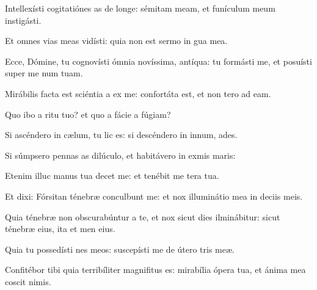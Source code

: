 \item {}

\item Intellexísti cogitatiónes as de longe:\psstar{} sémitam meam, et funículum meum instigásti.

\item Et omnes vias meas vidísti:\psstar{} quia non est sermo in gua mea.

\item Ecce, Dómine, tu cognovísti ómnia novíssima,  antíqua:\psstar{} tu formásti me, et posuísti super me num tuam.

\item Mirábilis facta est sciéntia a ex me:\psstar{} confortáta est, et non tero ad eam.

\item Quo ibo a ritu tuo?\psstar{} et quo a fácie a fúgiam?

\item Si ascéndero in cælum, tu lic es:\psstar{} si descéndero in innum, ades.

\item Si súmpsero pennas as dilúculo,\psstar{} et habitávero in exmis maris:

\item Etenim illuc manus tua decet me:\psstar{} et tenébit me tera tua.

\item Et dixi: Fórsitan ténebræ conculbunt me:\psstar{} et nox illuminátio mea in deciis meis.

\item Quia ténebræ non obscurabúntur a te, et nox sicut dies ilminábitur:\psstar{} sicut ténebræ eius, ita et men eius.

\item Quia tu possedísti nes meos:\psstar{} suscepísti me de útero tris meæ.

\item Confitébor tibi quia terribíliter magnifitus es:\psstar{} mirabília ópera tua, et ánima mea coscit nimis.

